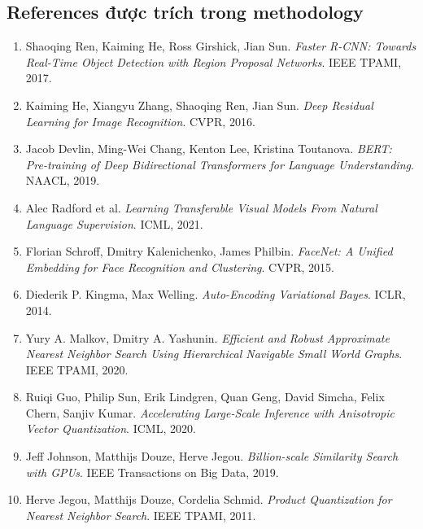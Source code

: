 \documentclass[12pt,a4paper]{article}
\begin{document}
\subsection{References được trích trong methodology}
\begin{enumerate}[resume]
  \item Shaoqing Ren, Kaiming He, Ross Girshick, Jian Sun. \emph{Faster R-CNN: Towards Real-Time Object Detection with Region Proposal Networks}. IEEE TPAMI, 2017.
  \item Kaiming He, Xiangyu Zhang, Shaoqing Ren, Jian Sun. \emph{Deep Residual Learning for Image Recognition}. CVPR, 2016.
  \item Jacob Devlin, Ming-Wei Chang, Kenton Lee, Kristina Toutanova. \emph{BERT: Pre-training of Deep Bidirectional Transformers for Language Understanding}. NAACL, 2019.
  \item Alec Radford et al. \emph{Learning Transferable Visual Models From Natural Language Supervision}. ICML, 2021.
  \item Florian Schroff, Dmitry Kalenichenko, James Philbin. \emph{FaceNet: A Unified Embedding for Face Recognition and Clustering}. CVPR, 2015.
  \item Diederik P. Kingma, Max Welling. \emph{Auto-Encoding Variational Bayes}. ICLR, 2014.
  \item Yury A. Malkov, Dmitry A. Yashunin. \emph{Efficient and Robust Approximate Nearest Neighbor Search Using Hierarchical Navigable Small World Graphs}. IEEE TPAMI, 2020.
  \item Ruiqi Guo, Philip Sun, Erik Lindgren, Quan Geng, David Simcha, Felix Chern, Sanjiv Kumar. \emph{Accelerating Large-Scale Inference with Anisotropic Vector Quantization}. ICML, 2020.
  \item Jeff Johnson, Matthijs Douze, Herve Jegou. \emph{Billion-scale Similarity Search with GPUs}. IEEE Transactions on Big Data, 2019.
  \item Herve Jegou, Matthijs Douze, Cordelia Schmid. \emph{Product Quantization for Nearest Neighbor Search}. IEEE TPAMI, 2011.
\end{enumerate}
\end{document}
